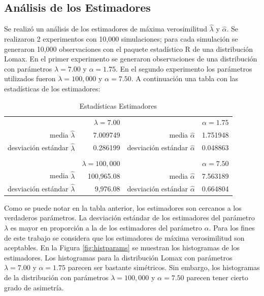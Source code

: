 \documentclass[11pt]{article}
\numberwithin{equation}{section} %
\begin{document}
\clearpage

\subsection{Análisis de los Estimadores}
\label{sec:estim}

Se realizó un análisis de los estimadores de máxima verosimilitud $\hat{\lambda}$ y $\hat{\alpha}$. Se realizaron 2 experimentos con 10,000 simulaciones; para cada simulación se generaron 10,000 observaciones con el paquete estadístico R de una distribución Lomax. En el primer experimento se generaron observaciones de una distribución con parámetros $\lambda=7.00$ y $\alpha=1.75$. En el segundo experimento los parámetros utilizados fueron $\lambda=100,000$ y $\alpha=7.50$. A continuación una tabla con las estadísticas de los estimadores:

\begin{table}[htbp]
\centering
\caption{Estadísticas Estimadores}
\begin{tabular}{r r r r}
& $\lambda=7.00$ & & $\alpha=1.75$ \\
media $\hat{\lambda}$ & 7.009749 & media $\hat{\alpha}$ & 1.751948\\
desviación estándar $\hat{\lambda}$ & 0.286199 & desviación estándar $\hat{\alpha}$ & 0.048863\\
\\
& $\lambda=100,000$ & & $\alpha=7.50$ \\
media $\hat{\lambda}$ & 100,965.08 & media $\hat{\alpha}$ & 7.563189\\
desviación estándar $\hat{\lambda}$ & 9,976.08 & desviación estándar $\hat{\alpha}$ & 0.664804\\
\end{tabular}%
\label{tab:estim}%
\end{table}%

Como se puede notar en la tabla anterior, los estimadores son cercanos a los verdaderos parámetros. La desviación estándar de los estimadores del parámetro $\lambda$ es mayor en proporción a la de los estimadores del parámetro $\alpha$. Para los fines de este trabajo se considera que los estimadores de máxima verosimilitud son aceptables. En la Figura \ref{fig:histparams} se muestran los histogramas de los estimadores. Los histogramas para la distribución Lomax con parámetros $\lambda=7.00$ y $\alpha=1.75$ parecen ser bastante simétricos. Sin embargo, los histogramas de la distribución con parámetros $\lambda=100,000$ y $\alpha=7.50$ parecen tener cierto grado de asimetría.
\end{document}
